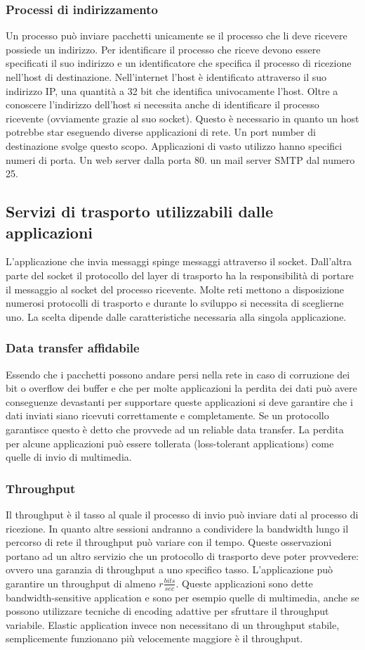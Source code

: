 \subsubsection{Processi di indirizzamento}
Un processo pu\`o inviare pacchetti unicamente se il processo che li deve ricevere possiede un indirizzo. Per identificare il processo che riceve devono essere specificati il suo indirizzo e un identificatore che 
specifica il processo di ricezione nell'host di destinazione. Nell'internet l'host \`e identificato attraverso il suo indirizzo IP, una quantit\`a a 32 bit che identifica univocamente l'host. Oltre a conoscere l'indirizzo
dell'host si necessita anche di identificare il processo ricevente (ovviamente grazie al suo socket). Questo \`e necessario in quanto un host potrebbe star eseguendo diverse applicazioni di rete. Un port number
di destinazione svolge questo scopo. Applicazioni di vasto utilizzo hanno specifici numeri di porta. Un web server dalla porta 80. un mail server SMTP dal numero 25. 
\subsection{Servizi di trasporto utilizzabili dalle applicazioni}
L'applicazione che invia messaggi spinge messaggi attraverso il socket. Dall'altra parte del socket il protocollo del layer di trasporto ha la responsibilit\`a di portare il messaggio al socket del processo ricevente.
Molte reti mettono a disposizione numerosi protocolli di trasporto e durante lo sviluppo si necessita di sceglierne uno. La scelta dipende dalle caratteristiche necessaria alla singola applicazione.
\subsubsection{Data transfer affidabile}
Essendo che i pacchetti possono andare persi nella rete in caso di corruzione dei bit o overflow dei buffer e che per molte applicazioni la perdita dei dati pu\`o avere conseguenze devastanti per supportare queste
applicazioni si deve garantire che i dati inviati siano ricevuti correttamente e completamente. Se un protocollo garantisce questo \`e detto che provvede ad un reliable data transfer. La perdita per alcune 
applicazioni pu\`o essere tollerata (loss-tolerant applications) come quelle di invio di multimedia. 
\subsubsection{Throughput}
Il throughput \`e il tasso al quale il processo di invio pu\`o inviare dati al processo di ricezione. In quanto altre sessioni andranno a condividere la bandwidth lungo il percorso di rete il throughput pu\`o variare 
con il tempo. Queste osservazioni portano ad un altro servizio che un protocollo di trasporto deve poter provvedere: ovvero una garanzia di throughput a uno specifico tasso. L'applicazione pu\`o garantire un 
throughput di almeno $r\frac{bits}{sec}$. Queste applicazioni sono dette bandwidth-sensitive application e sono per esempio quelle di multimedia, anche se possono utilizzare tecniche di encoding adattive
per sfruttare il throughput variabile. Elastic application invece non necessitano di un throughput stabile, semplicemente funzionano pi\`u velocemente maggiore \`e il throughput. 
